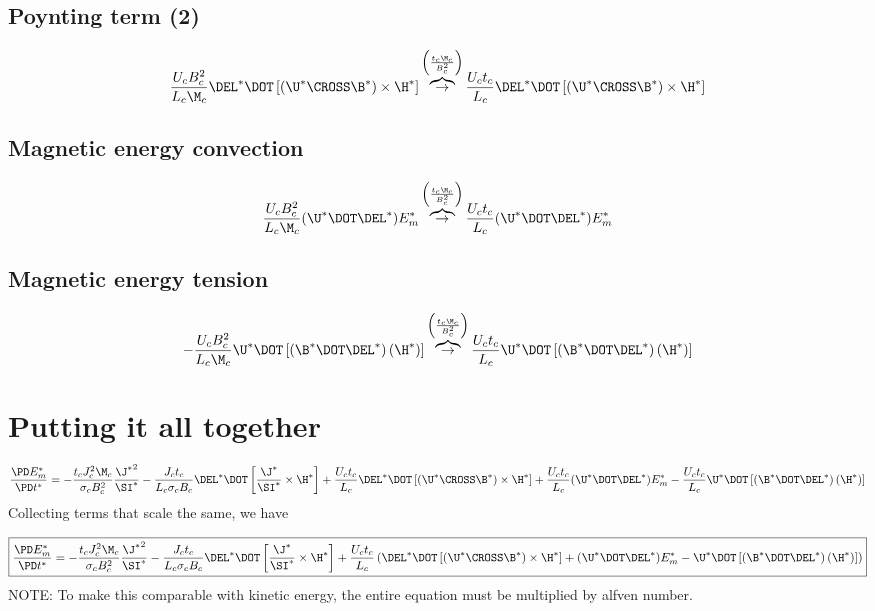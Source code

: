 \documentclass[11pt]{article}
\newcommand{\OB}{\overbrace{\rightarrow}^{\left(\frac{t_c \M_c}{B_c^2}\right)}}
\begin{document}
\subsection{Poynting term (2)}
\begin{equation}
	\frac{U_c B_c^2}{L_c \M_c} \DEL^* \DOT \left[\left(\U^* \CROSS \B^* \right) \times \H^* \right]
	\OB
	\frac{U_c t_c}{L_c} \DEL^* \DOT \left[\left(\U^* \CROSS \B^* \right) \times \H^* \right]
\end{equation}
\subsection{Magnetic energy convection}
\begin{equation}
	\frac{U_c B_c^2}{L_c \M_c} (\U^* \DOT \DEL^*) E_m^*
	\OB
	\frac{U_c t_c}{L_c} (\U^* \DOT \DEL^*) E_m^*
\end{equation}
\subsection{Magnetic energy tension}
\begin{equation}
	- \frac{U_c B_c^2}{L_c \M_c} \U^* \DOT \left[(\B^* \DOT \DEL^*) \left( \H^* \right) \right]
	\OB
	\frac{U_c t_c}{L_c} \U^* \DOT \left[(\B^* \DOT \DEL^*) \left( \H^* \right) \right]
\end{equation}
\section{Putting it all together}
\begin{equation}
	\frac{\PD E_m^*}{\PD t^*} =
	- \frac{t_c J_c^2 \M_c}{\sigma_c B_c^2} \frac{{\J^*}^2}{\SI^*}
	- \frac{J_c t_c}{L_c \sigma_c B_c} \DEL^* \DOT \left[\frac{\J^*}{\SI^*} \times \H^* \right]
	+ \frac{U_c t_c}{L_c} \DEL^* \DOT \left[\left(\U^* \CROSS \B^* \right) \times \H^* \right]
	+ \frac{U_c t_c}{L_c} (\U^* \DOT \DEL^*) E_m^*
	- \frac{U_c t_c}{L_c} \U^* \DOT \left[(\B^* \DOT \DEL^*) \left( \H^* \right) \right]
\end{equation}
Collecting terms that scale the same, we have

\begin{equation}
	\boxed{
	\frac{\PD E_m^*}{\PD t^*} =
	- \frac{t_c J_c^2 \M_c}{\sigma_c B_c^2} \frac{{\J^*}^2}{\SI^*}
	- \frac{J_c t_c}{L_c \sigma_c B_c} \DEL^* \DOT \left[\frac{\J^*}{\SI^*} \times \H^* \right]
	+ \frac{U_c t_c}{L_c} \left(
	\DEL^* \DOT \left[\left(\U^* \CROSS \B^* \right) \times \H^* \right]
	+ (\U^* \DOT \DEL^*) E_m^*
	- \U^* \DOT \left[(\B^* \DOT \DEL^*) \left( \H^* \right) \right]
	\right)
	}
\end{equation}
NOTE: To make this comparable with kinetic energy, the entire equation must be multiplied by alfven number.
\end{document}
